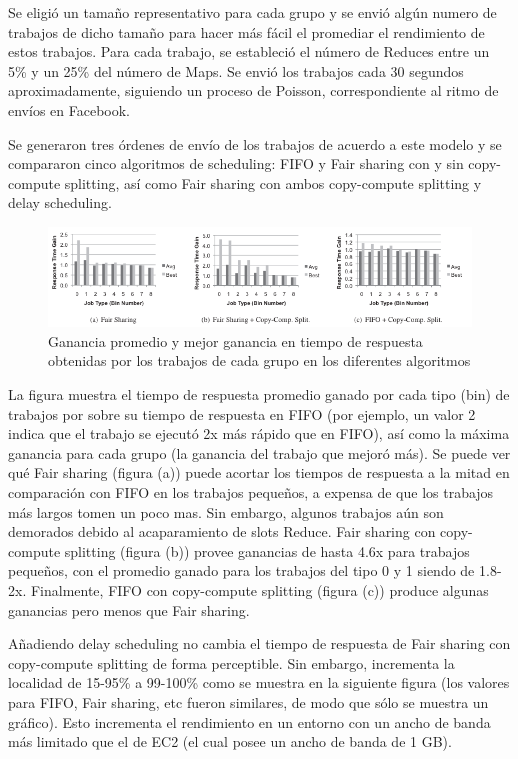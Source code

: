 Se eligió un tamaño representativo para cada grupo y se envió algún numero de trabajos de dicho tamaño para hacer más fácil el promediar el rendimiento de estos trabajos. Para cada trabajo, se estableció el número de Reduces entre un 5\% y un 25\% del número de Maps. Se envió los trabajos cada 30 segundos aproximadamente, siguiendo un proceso de Poisson, correspondiente al ritmo de envíos en Facebook.

Se generaron tres órdenes de envío de los trabajos de acuerdo a este modelo y se compararon cinco algoritmos de scheduling: FIFO y Fair sharing con y sin copy-compute splitting, así como Fair sharing con ambos copy-compute splitting y delay scheduling.
    
\begin{figure}[H]
\begin{center}
\includegraphics[scale=0.67]{img/img3.png}
     \caption{Ganancia promedio y mejor ganancia en tiempo de respuesta obtenidas por los trabajos de cada grupo en los diferentes algoritmos}
\end{center}
\end{figure}

La figura muestra el tiempo de respuesta promedio ganado por cada tipo (bin) de trabajos por sobre su tiempo de respuesta en FIFO (por ejemplo, un valor 2 indica que el trabajo se ejecutó 2x más rápido que en FIFO), así como la máxima ganancia para cada grupo (la ganancia del trabajo que mejoró más). Se puede ver qué Fair sharing (figura (a)) puede acortar los tiempos de respuesta a la mitad en comparación con FIFO en los trabajos pequeños, a expensa de que los trabajos más largos tomen un poco mas. Sin embargo, algunos trabajos aún son demorados debido al acaparamiento de slots Reduce. Fair sharing con copy-compute splitting (figura (b)) provee ganancias de hasta 4.6x para trabajos pequeños, con el promedio ganado para los trabajos del tipo 0 y 1 siendo de 1.8-2x.
Finalmente, FIFO con copy-compute splitting (figura (c)) produce algunas ganancias pero menos que Fair sharing.

Añadiendo delay scheduling no cambia el tiempo de respuesta de Fair sharing con copy-compute splitting de forma perceptible. Sin embargo, incrementa la localidad de 15-95\% a 99-100\% como se muestra en la siguiente figura (los valores para FIFO, Fair sharing, etc fueron similares, de modo que sólo se muestra un gráfico). Esto incrementa el rendimiento en un entorno con un ancho de banda más limitado que el de EC2 (el cual posee un ancho de banda de 1 GB).

